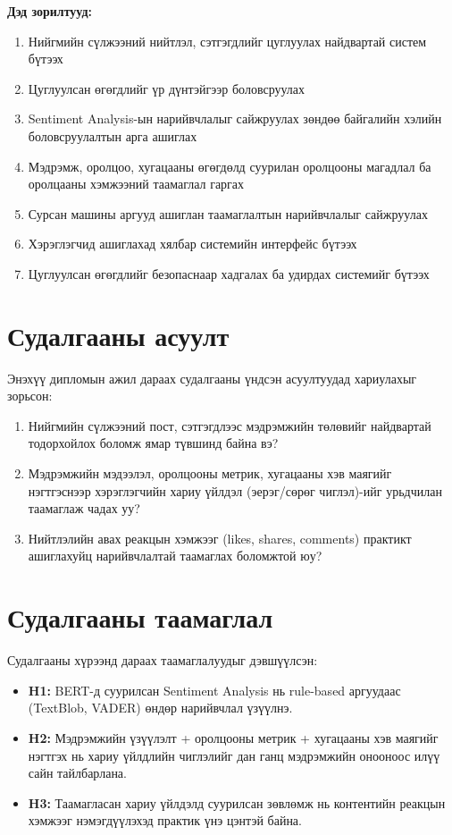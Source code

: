 \documentclass[12pt,a4paper]{report}
\begin{document}
\textbf{Дэд зорилтууд:}
\begin{enumerate}
    \item Нийгмийн сүлжээний нийтлэл, сэтгэгдлийг цуглуулах найдвартай систем бүтээх
    \item Цуглуулсан өгөгдлийг үр дүнтэйгээр боловсруулах
    \item Sentiment Analysis-ын нарийвчлалыг сайжруулах зөндөө байгалийн хэлийн боловсруулалтын арга ашиглах
    \item Мэдрэмж, оролцоо, хугацааны өгөгдөлд суурилан оролцооны магадлал ба оролцааны хэмжээний таамаглал гаргах
    \item Сурсан машины аргууд ашиглан таамаглалтын нарийвчлалыг сайжруулах
    \item Хэрэглэгчид ашиглахад хялбар системийн интерфейс бүтээх
    \item Цуглуулсан өгөгдлийг безопаснаар хадгалах ба удирдах системийг бүтээх
\end{enumerate}

\section{Судалгааны асуулт}

Энэхүү дипломын ажил дараах судалгааны үндсэн асуултуудад хариулахыг зорьсон:

\begin{enumerate}
    \item Нийгмийн сүлжээний пост, сэтгэгдлээс мэдрэмжийн төлөвийг найдвартай тодорхойлох боломж ямар түвшинд байна вэ?
    \item Мэдрэмжийн мэдээлэл, оролцооны метрик, хугацааны хэв маягийг нэгтгэснээр хэрэглэгчийн хариу үйлдэл (эерэг/сөрөг чиглэл)-ийг урьдчилан таамаглаж чадах уу?
    \item Нийтлэлийн авах реакцын хэмжээг (likes, shares, comments) практикт ашиглахуйц нарийвчлалтай таамаглах боломжтой юу?
\end{enumerate}

\section{Судалгааны таамаглал}

Судалгааны хүрээнд дараах таамаглалуудыг дэвшүүлсэн:

\begin{itemize}
    \item \textbf{H1:} BERT-д суурилсан Sentiment Analysis нь rule-based аргуудаас (TextBlob, VADER) өндөр нарийвчлал үзүүлнэ.
    \item \textbf{H2:} Мэдрэмжийн үзүүлэлт + оролцооны метрик + хугацааны хэв маягийг нэгтгэх нь хариу үйлдлийн чиглэлийг дан ганц мэдрэмжийн онооноос илүү сайн тайлбарлана.
    \item \textbf{H3:} Таамагласан хариу үйлдэлд суурилсан зөвлөмж нь контентийн реакцын хэмжээг нэмэгдүүлэхэд практик үнэ цэнтэй байна.
\end{itemize}
\end{document}
